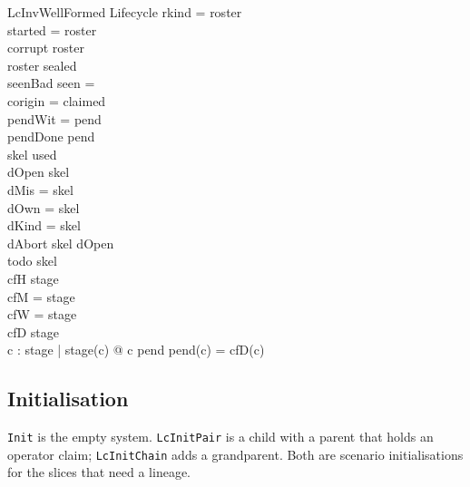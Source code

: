 \documentclass[a4paper,10pt,fleqn]{article}
\newcommand{\field}[1]{\texttt{#1}}
\begin{document}
\begin{schema}{LcInvWellFormed}
Lifecycle
\where
\dom rkind = roster \\
\dom started = roster \\
corrupt \subseteq roster \\
roster \subseteq \dom sealed \\
seenBad \cap \dom seen = \emptyset \\
\dom corigin = \dom claimed \\
\dom pendWit = \dom pend \\
pendDone \subseteq \dom pend \\
skel \subseteq used \\
dOpen \subseteq skel \\
\dom dMis = skel \\
\dom dOwn = skel \\
\dom dKind = skel \\
dAbort \subseteq skel \setminus dOpen \\
todo \subseteq skel \\
cfH \subseteq \dom stage \\
\dom cfM = \dom stage \\
\dom cfW = \dom stage \\
\dom cfD \subseteq \dom stage \\
\forall c : \dom stage | stage(c)  @ c \in \dom pend \land pend(c) = cfD(c)
\end{schema}



\subsection{Initialisation}
\label{sec:lc-init}

\field{Init} is the empty system. \field{LcInitPair} is a child with a
parent that holds an operator claim; \field{LcInitChain} adds a grandparent.
Both are scenario initialisations for the slices that need a lineage.
\end{document}
